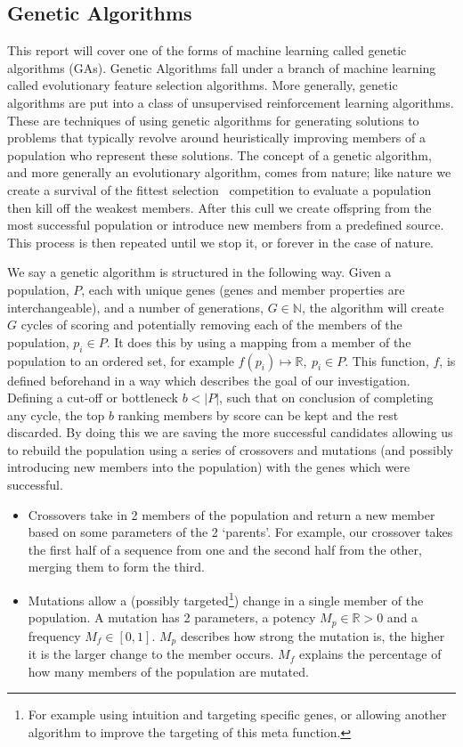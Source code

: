 \subsection{Genetic Algorithms}\label{subsec:geneticAlgorithms}
This report will cover one of the forms of machine learning called genetic algorithms (GAs).
Genetic Algorithms fall under a branch of machine learning called evolutionary feature selection algorithms.
More generally, genetic algorithms are put into a class of unsupervised reinforcement learning algorithms.
These are techniques of using genetic algorithms for generating solutions to problems that typically revolve around heuristically improving members of a population who represent these solutions.
The concept of a genetic algorithm, and more generally an evolutionary algorithm, comes from nature;
like nature we create a survival of the fittest selection~\cite{darwin2009origin} competition to evaluate a population then kill off the weakest members.
After this cull we create offspring from the most successful population or introduce new members from a predefined source.
This process is then repeated until we stop it, or forever in the case of nature.

We say a genetic algorithm is structured in the following way.
Given a population, \(P\), each with unique genes (genes and member properties are interchangeable), and a number of generations, \(G\in \mathbb{N}\), the algorithm will create \(G\) cycles of scoring and potentially removing each of the members of the population, \(p_i \in P\).
It does this by using a mapping from a member of the population to an ordered set, for example \(f(p_i)\mapsto \mathbb{R},\ p_i \in P\).
This function, \(f\), is defined beforehand in a way which describes the goal of our investigation.
Defining a cut-off or bottleneck \(b<|P|\), such that on conclusion of completing any cycle, the top \(b\) ranking members by score can be kept and the rest discarded.
By doing this we are saving the more successful candidates allowing us to rebuild the population using a series of crossovers and mutations (and possibly introducing new members into the population) with the genes which were successful.

\begin{itemize}
    \item Crossovers take in 2 members of the population and return a new member based on some parameters of the 2 `parents'.
    For example, our crossover takes the first half of a sequence from one and the second half from the other, merging them to form the third.
    \item Mutations allow a (possibly targeted\footnote{For example using intuition and targeting specific genes, or allowing another algorithm to improve the targeting of this meta function.}) change in a single member of the population.
    A mutation has 2 parameters, a potency \(M_p\in \mathbb{R}>0\) and a frequency \(M_f\in [0,1]\).
    \(M_p\) describes how strong the mutation is, the higher it is the larger change to the member occurs.
    \(M_f\) explains the percentage of how many members of the population are mutated.
\end{itemize}

